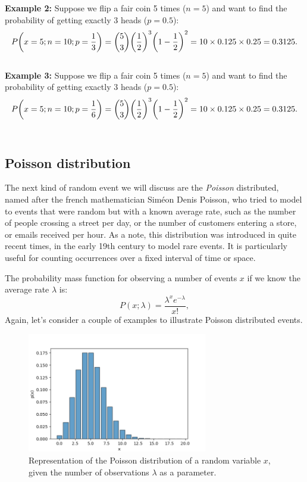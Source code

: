 \documentclass{book}
\begin{document}
\textbf{Example 2:} Suppose we flip a fair coin 5 times ($n=5$) and want to find the probability of getting exactly 3 heads ($p=0.5$):
\begin{equation}
    P\bigg(x=5; n = 10; p = \frac{1}{3}\bigg) = \binom{5}{3} \bigg(\frac{1}{2}\bigg)^3 \bigg(1 - \frac{1}{2}\bigg)^2 = 10 \times 0.125 \times 0.25 = 0.3125. \notag
\end{equation}\\

\textbf{Example 3:} Suppose we flip a fair coin 5 times ($n=5$) and want to find the probability of getting exactly 3 heads ($p=0.5$):
\begin{equation}
    P\bigg(x=5; n = 10; p = \frac{1}{6}\bigg) = \binom{5}{3} \bigg(\frac{1}{2}\bigg)^3 \bigg(1 - \frac{1}{2}\bigg)^2 = 10 \times 0.125 \times 0.25 = 0.3125. \notag
\end{equation}\\

\newpage

\subsection{Poisson distribution}
The next kind of random event we will discuss are the \textit{Poisson} distributed, named after the french mathematician Sim\'eon Denis Poisson, who tried to model to events that were random but with a known average rate, such as the number of people crossing a street per day, or the number of customers entering a store, or emails received per hour.
As a note, this distribution was introduced in quite recent times, in the early 19th century to model rare events. It is particularly useful for counting occurrences over a fixed interval of time or space. 

The probability mass function for observing a number of events $x$ if we know the average rate $\lambda$ is:
\begin{equation}
    P(x; \lambda) = \frac{\lambda^x e^{-\lambda}}{x!},
\end{equation}
Again, let's consider a couple of examples to illustrate Poisson distributed events.

\begin{figure}[ht]
    \centering
    \includegraphics[width=0.7\textwidth]{figures/chapter2/poisson.png}
    \caption{Representation of the Poisson distribution of a random variable $x$, given the number of observations $\lambda$ as a parameter.}
    \label{fig:poisson1}
\end{figure}
\end{document}
